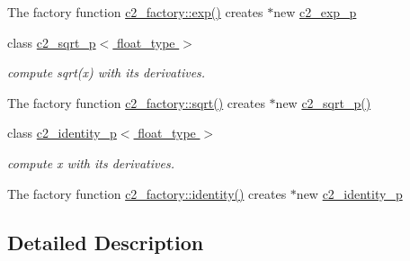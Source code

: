 \begin{DoxyCompactItemize}
\begin{DoxyCompactList}
The factory function \hyperlink{classc2__factory_ad6c29a455b386c1971e6614f6962f3da}{c2\+\_\+factory\+::exp()} creates $\ast$new \hyperlink{classc2__exp__p}{c2\+\_\+exp\+\_\+p} \end{DoxyCompactList}\item 
class \hyperlink{classc2__sqrt__p}{c2\+\_\+sqrt\+\_\+p$<$ float\+\_\+type $>$}
\begin{DoxyCompactList}\small\item\em compute sqrt(x) with its derivatives.

The factory function \hyperlink{classc2__factory_a5b189f66ec65267f3812cdc45ccf072d}{c2\+\_\+factory\+::sqrt()} creates $\ast$new \hyperlink{classc2__sqrt__p_a780a0f48a8fb428b2cb9fac74b7b56e7}{c2\+\_\+sqrt\+\_\+p()} \end{DoxyCompactList}\item 
class \hyperlink{classc2__identity__p}{c2\+\_\+identity\+\_\+p$<$ float\+\_\+type $>$}
\begin{DoxyCompactList}\small\item\em compute x with its derivatives.

The factory function \hyperlink{classc2__factory_a66970667d203c0e63a016b08d2472dc4}{c2\+\_\+factory\+::identity()} creates $\ast$new \hyperlink{classc2__identity__p}{c2\+\_\+identity\+\_\+p} \end{DoxyCompactList}\end{DoxyCompactItemize}


\subsection{Detailed Description}
